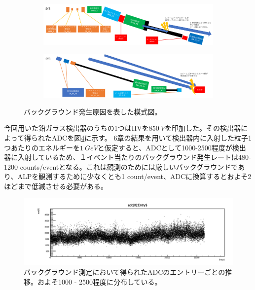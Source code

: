 \begin{figure}[H]
	\begin{subfigure}{.9\textwidth}
 		 	\includegraphics[width=300pt]{./Figure/EBES/Background_cause1.png}%
  			\caption{}
  			\label{fig:sfig1}
	\end{subfigure}
	\begin{subfigure}{.9\textwidth}
			\includegraphics[width=300pt]{./Figure/EBES/Background_cause2.png}%
			\caption{}
			\label{fig:sfig2}
	\end{subfigure}
	\caption[バックグラウンド発生原因を表した模式図]{バックグラウンド発生原因を表した模式図。}
	\label{background_source}
\end{figure}


今回用いた鉛ガラス検出器のうちの1つはHVを$\SI{850}{V}$を印加した。その検出器によって得られたADCを図\ref{background}に示す。
6章の結果を用いて検出器内に入射した粒子1つあたりのエネルギーを$\SI{1}{GeV}$と仮定すると、ADCとして1000-2500程度が検出器に入射しているため、１イベント当たりのバックグラウンド発生レートは480-1200 counts/eventとなる。これは観測のためには厳しいバックグラウンドであり、ALPを観測するために少なくとも1 count/event、ADCに換算するとおよそ2ほどまで低減させる必要がある。

\begin{figure}[H]
	\begin{center}
		\includegraphics[width=330pt]{./Figure/EBES/background_ADC.png}
		\caption[バックグラウンド測定において得られたADCのエントリーごとの推移]{バックグラウンド測定において得られたADCのエントリーごとの推移。およそ1000 - 2500程度に分布している。}
		\label{background}
	\end{center}
\end{figure}

